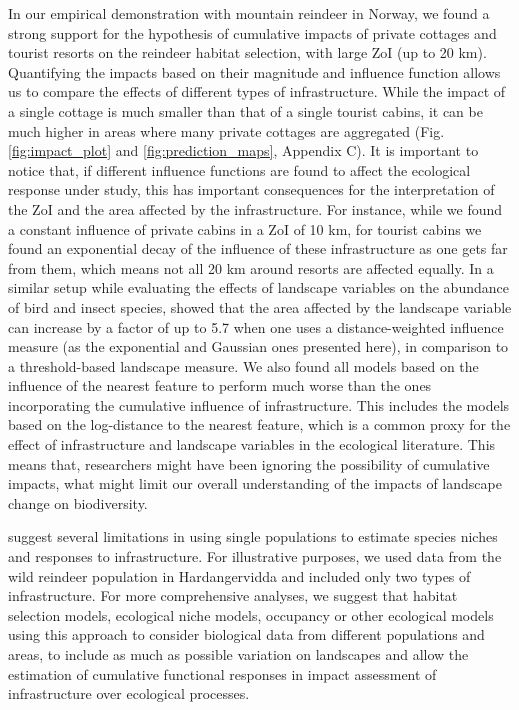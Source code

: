 \documentclass[titlepage]{article}
\begin{document}
In our empirical demonstration with mountain reindeer in Norway, we found a strong support for the hypothesis of cumulative impacts of private cottages and tourist resorts on the reindeer habitat selection, with large ZoI (up to 20 km). Quantifying the impacts based on their magnitude and influence function allows us to compare the effects of different types of infrastructure. While the impact of a single cottage is much smaller than that of a single tourist cabins, it can be much higher in areas where many private cottages are aggregated (Fig. \ref{fig:impact_plot} and \ref{fig:prediction_maps}, Appendix C). It is important to notice that, if different influence functions are found to affect the ecological response under study, this has important consequences for the interpretation of the ZoI and the area affected by the infrastructure. For instance, while we found a constant influence of private cabins in a ZoI of 10 km, for tourist cabins we found an exponential decay of the influence of these infrastructure as one gets far from them, which means not all 20 km around resorts are affected equally. In a similar setup while evaluating the effects of landscape variables on the abundance of bird and insect species, \citet{miguet_how_2017} showed that the area affected by the landscape variable can increase by a factor of up to 5.7 when one uses a distance-weighted influence measure (as the exponential and Gaussian ones presented here), in comparison to a threshold-based landscape measure. 
We also found all models based on the influence of the nearest feature to perform much worse than the ones incorporating the cumulative influence of infrastructure. This includes the models based on the log-distance to the nearest feature, which is a common proxy for the effect of infrastructure and landscape variables in the ecological literature. This means that, researchers might have been ignoring 
the possibility of cumulative impacts, what might limit our overall understanding of the impacts of landscape change on biodiversity.

\citet{panzacchi_searching_2015} suggest several limitations in using single populations to estimate species niches and responses to infrastructure. For illustrative purposes, we used data from the wild reindeer population in Hardangervidda and included only two types of infrastructure. For more comprehensive analyses, we suggest that habitat selection models, ecological niche models, occupancy or other ecological models using this approach to consider biological data from different populations and areas, to include as much as possible variation on landscapes and allow the estimation of cumulative functional responses in impact assessment of infrastructure over ecological processes.  
\end{document}
